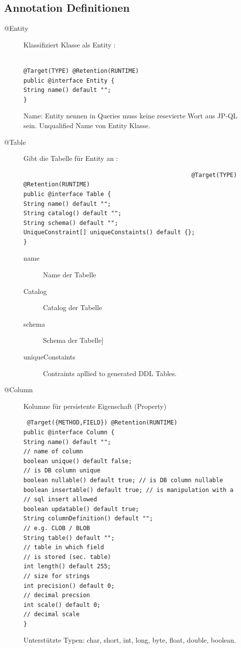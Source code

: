 \documentclass[a4paper,10pt]{scrreprt}
\begin{document}
\subsection{Annotation Definitionen}
\begin{description}
 \item [@Entity] Klassifiziert Klasse als Entity : \begin{verbatim}
                                                    @Target(TYPE) @Retention(RUNTIME)
public @interface Entity {
String name() default "";
}
                                                   \end{verbatim}
Name: Entity nennen in Queries muss keine resevierte Wort aus JP-QL sein.
Unqualified  Name von Entity Klasse.
\item[@Table] Gibt die Tabelle für Entity an : \begin{verbatim}
                                                @Target(TYPE) @Retention(RUNTIME)
public @interface Table {
String name() default "";
String catalog() default "";
String schema() default "";
UniqueConstraint[] uniqueConstaints() default {};
}
                                               \end{verbatim}
\begin{description}
 \item [name] Name der Tabelle
 \item [Catalog] Catalog der Tabelle
  \item [schema] Schema der Tabelle]
  \item [uniqueConstaints] Contraints apllied to generated DDL Tables.
\end{description}
\item [@Column] Kolumne für persistente Eigenschaft (Property)
\begin{verbatim}
 @Target({METHOD,FIELD}) @Retention(RUNTIME)
public @interface Column {
String name() default "";
// name of column
boolean unique() default false;
// is DB column unique
boolean nullable() default true; // is DB column nullable
boolean insertable() default true; // is manipulation with a
// sql insert allowed
boolean updatable() default true;
String columnDefinition() default "";
// e.g. CLOB / BLOB
String table() default "";
// table in which field
// is stored (sec. table)
int length() default 255;
// size for strings
int precision() default 0;
// decimal precsion
int scale() default 0;
// decimal scale
}
\end{verbatim}
Unterstützte Typen: char, short, int, long, byte, float, double, boolean.

\end{description}
\end{document}
